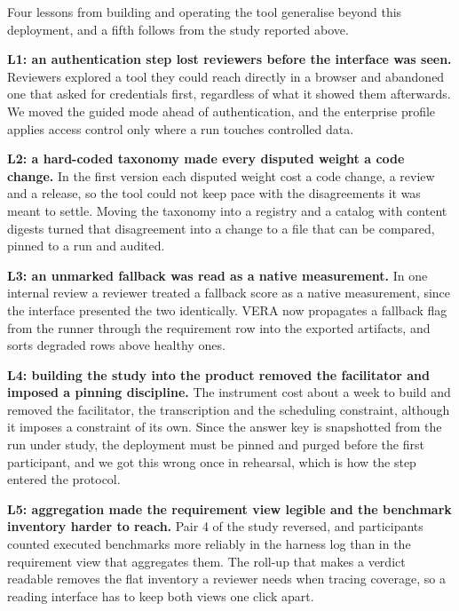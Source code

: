 \documentclass[10pt,conference]{IEEEtran}
\begin{document}
Four lessons from building and operating the tool generalise beyond this deployment, and a fifth follows from the study reported above.

\textbf{L1: an authentication step lost reviewers before the interface was seen.}
Reviewers explored a tool they could reach directly in a browser and abandoned one that asked for credentials first, regardless of what it showed them afterwards.
We moved the guided mode ahead of authentication, and the enterprise profile applies access control only where a run touches controlled data.

\textbf{L2: a hard-coded taxonomy made every disputed weight a code change.}
In the first version each disputed weight cost a code change, a review and a release, so the tool could not keep pace with the disagreements it was meant to settle.
Moving the taxonomy into a registry and a catalog with content digests turned that disagreement into a change to a file that can be compared, pinned to a run and audited.

\textbf{L3: an unmarked fallback was read as a native measurement.}
In one internal review a reviewer treated a fallback score as a native measurement, since the interface presented the two identically.
VERA now propagates a fallback flag from the runner through the requirement row into the exported artifacts, and sorts degraded rows above healthy ones.

\textbf{L4: building the study into the product removed the facilitator and imposed a pinning discipline.}
The instrument cost about a week to build and removed the facilitator, the transcription and the scheduling constraint, although it imposes a constraint of its own.
Since the answer key is snapshotted from the run under study, the deployment must be pinned and purged before the first participant, and we got this wrong once in rehearsal, which is how the step entered the protocol.

\textbf{L5: aggregation made the requirement view legible and the benchmark inventory harder to reach.}
Pair 4 of the study reversed, and participants counted executed benchmarks more reliably in the harness log than in the requirement view that aggregates them.
The roll-up that makes a verdict readable removes the flat inventory a reviewer needs when tracing coverage, so a reading interface has to keep both views one click apart.
\end{document}

